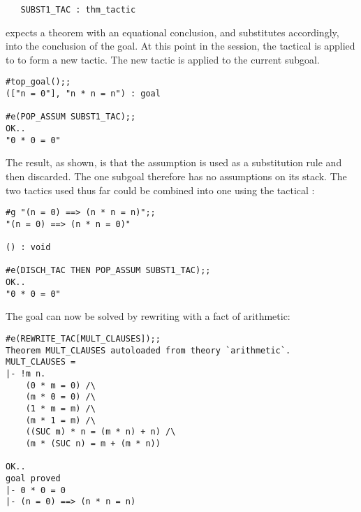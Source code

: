 \begin{holboxed}\begin{verbatim}
   SUBST1_TAC : thm_tactic
\end{verbatim}\end{holboxed}

\noindent {} expects a theorem with an equational conclusion, and
substitutes accordingly, into the conclusion of the goal. At this
point in the session, the tactical
 is applied to
 to form a new tactic.
The new tactic is applied to the current subgoal.

\begin{session}\begin{verbatim}
#top_goal();;
(["n = 0"], "n * n = n") : goal

#e(POP_ASSUM SUBST1_TAC);;
OK..
"0 * 0 = 0"
\end{verbatim}\end{session}

\noindent The result, as shown, is that the assumption is used as a
substitution rule and then discarded.
The one subgoal therefore has no
assumptions on its stack.  The two tactics used thus far could be combined
into one using the tactical :

\setcounter{sessioncount}{1}
\begin{session}\begin{verbatim}
#g "(n = 0) ==> (n * n = n)";;
"(n = 0) ==> (n * n = 0)"

() : void

#e(DISCH_TAC THEN POP_ASSUM SUBST1_TAC);;
OK..
"0 * 0 = 0"
\end{verbatim}\end{session}

\noindent The goal can now be solved by rewriting with a fact of arithmetic:

\begin{session}\begin{verbatim}
#e(REWRITE_TAC[MULT_CLAUSES]);;
Theorem MULT_CLAUSES autoloaded from theory `arithmetic`.
MULT_CLAUSES =
|- !m n.
    (0 * m = 0) /\
    (m * 0 = 0) /\
    (1 * m = m) /\
    (m * 1 = m) /\
    ((SUC m) * n = (m * n) + n) /\
    (m * (SUC n) = m + (m * n))

OK..
goal proved
|- 0 * 0 = 0
|- (n = 0) ==> (n * n = n)
\end{verbatim}\end{session}

